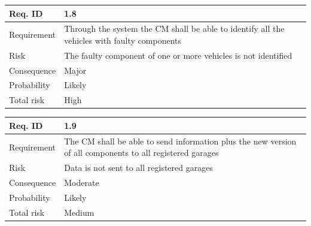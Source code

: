 \begin{table}[H]
\centering
\begin{tabularx}{1.0\textwidth}{
    |p{}%
    |p{}|%
}
\hline
Req. ID
& 1.8
\\
\hline

Requirement
& Through the system the CM shall be able to identify all the vehicles with faulty components
\\
\hline

Risk
& 
The faulty component of one or more vehicles is not identified
\\
\hline

Consequence
& 
Major
\\
\hline

Probability
&
Likely
\\
\hline

Total risk
&
High
\\
\hline

\end{tabularx}
\end{table}


\begin{table}[H]
\centering
\begin{tabularx}{1.0\textwidth}{
    |p{}%
    |p{}|%
}
\hline
Req. ID
& 1.9
\\
\hline

Requirement
& The CM shall be able to send information plus the new version of all components to all registered garages
\\
\hline

Risk
& 
Data is not sent to all registered garages 
\\
\hline

Consequence
&
Moderate
\\
\hline

Probability
&
Likely
\\
\hline

Total risk
&
Medium
\\
\hline

\end{tabularx}
\end{table}

%
%
%
%
%
%
%
%
%
%
%

